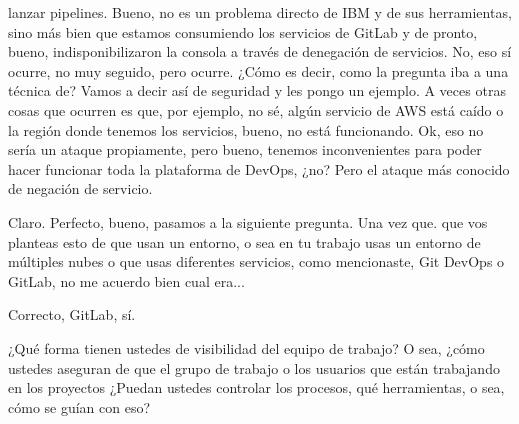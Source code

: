 \begin{description}[leftmargin=0cm, labelsep=0.5cm]
lanzar pipelines. Bueno, no es un problema directo de IBM y de sus herramientas, sino más bien que estamos consumiendo los servicios de GitLab y de pronto, bueno, indisponibilizaron la consola a través de denegación de servicios. No, eso sí ocurre, no muy seguido, pero ocurre. ¿Cómo es decir, como la pregunta iba a una técnica de? Vamos a decir así de seguridad y les pongo un ejemplo. A veces otras cosas que ocurren es que, por ejemplo, no sé, algún servicio de AWS está caído o la región donde tenemos los servicios, bueno, no está funcionando. Ok, eso no sería un ataque propiamente, pero bueno, tenemos inconvenientes para poder hacer funcionar toda la plataforma de DevOps, ¿no? Pero el ataque más conocido de negación de servicio.

    \item[\textbf{MUNTAABSKI FEDERICO:}] Claro. Perfecto, bueno, pasamos a la siguiente pregunta. Una vez que. que vos planteas esto de que usan un entorno, o sea en tu trabajo usas un entorno de múltiples nubes o que usas diferentes servicios, como mencionaste, Git DevOps o GitLab, no me acuerdo bien cual era...

    \item[\textbf{VILLARINO PABLO RODOLFO:}] Correcto, GitLab, sí.

    \item[\textbf{MUNTAABSKI FEDERICO:}] ¿Qué forma tienen ustedes de visibilidad del equipo de trabajo? O sea, ¿cómo ustedes aseguran de que el grupo de trabajo o los usuarios que están trabajando en los proyectos ¿Puedan ustedes controlar los procesos, qué herramientas, o sea, cómo se guían con eso?


\end{description}
